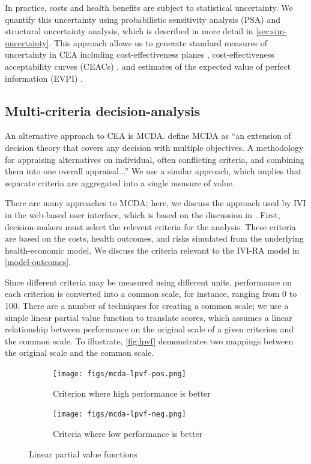\documentclass[11pt,final,fleqn]{article}\usepackage[]{graphicx}\usepackage[]{color}
\theoremstyle{plain}
\begin{document}
In practice, costs and health benefits are subject to statistical uncertainty. We quantify this uncertainty using probabilistic sensitivity analysis (PSA) and structural uncertainty analysis, which is described in more detail in \autoref{sec:sim-uncertainty}. This approach allows us to generate standard measures of uncertainty in CEA including cost-effectiveness planes \citep{black1990plane}, cost-effectiveness acceptability curves (CEACs) \citep{van1994costs, briggs1999bayesian, fenwick2001representing}, and estimates of the expected value of perfect information (EVPI) \citep{fenwick2001representing}.

\subsection{Multi-criteria decision-analysis}
An alternative approach to CEA is MCDA. \citet{keeney1993decisions} define MCDA as ``an extension of decision theory that covers any decision with multiple objectives. A methodology for appraising alternatives on individual, often conflicting criteria, and combining them into one overall appraisal...'' We use a similar approach, which implies that separate criteria are aggregated into a single measure of value.

There are many approaches to MCDA; here, we discuss the approach used by IVI in the web-based user interface, which is based on the discussion in \citet{thokala2016multiple}. First, decision-makers must select the relevent criteria for the analysis. These criteria are based on the costs, health outcomes, and risks simulated from the underlying health-economic model. We discuss the criteria relevant to the IVI-RA model in \autoref{model-outcomes}.

Since different criteria may be measured using different units, performance on each criterion is converted into a common scale, for instance, ranging from 0 to 100. There are a number of techniques for creating a common scale; we use a simple linear partial value function to translate scores, which assumes a linear relationship between performance on the original scale of a given criterion and the common scale. To illustrate, \autoref{fig:lpvf} demonstrates two mappings between the original scale and the common scale.



\begin{figure}[h]
\begin{subfigure}{.5\textwidth}
\texttt{[image: figs/mcda-lpvf-pos.png]}
\caption{Criterion where high performance is better} \label{subfig:lpvf-pos}
\end{subfigure}
\begin{subfigure}{.5\textwidth}
\texttt{[image: figs/mcda-lpvf-neg.png]}
\caption{Criteria where low performance is better} \label{subfig:lpvf-neg}
\end{subfigure}
\caption{Linear partial value functions}\label{fig:lpvf}
\end{figure}
\end{document}
